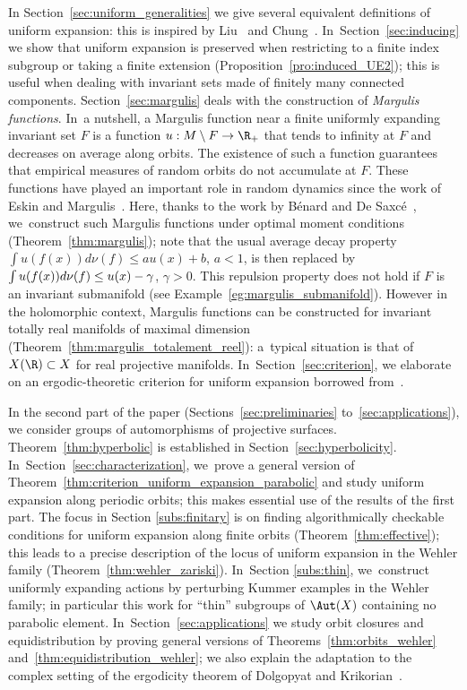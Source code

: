 In Section~\ref{sec:uniform_generalities} we give several equivalent definitions of uniform expansion:
this is inspired by Liu~\cite{liu_thesis} and Chung~\cite{chung}. In~Section~\ref{sec:inducing} we show that uniform expansion is preserved
when restricting to a finite index
subgroup or taking a finite extension (Proposition~\ref{pro:induced_UE2}); this
is useful when dealing with invariant sets made of finitely many connected components. Section~\ref{sec:margulis} deals with the construction of
\emph{Margulis functions}. In~a nutshell, a Margulis function
near a finite uniformly expanding invariant set $F$ is a function
$u:M\setminus F\to \R_+$ that tends to infinity at $F$ and decreases on average along orbits.
The existence of such a function
guarantees that empirical measures of random orbits do not accumulate at $F$. These functions have played an
important role in random dynamics since the work of Eskin and Margulis~\cite{eskin-margulis}.
Here, thanks to the work by Bénard and De Saxcé~\cite{benard-desaxce}, we~construct such Margulis functions under optimal moment conditions (Theorem~\ref{thm:margulis});
note that the usual average
decay property $\int u (f(x)) d\nu(f) \leq a u(x)+b$, $a<1$, is then replaced by $\int u (f(x)) d\nu(f) \leq u(x) -\nobreak \gamma$, $\gamma>0$. This repulsion property does not hold if $F$ is an invariant submanifold (see Example~\ref{eg:margulis_submanifold}). However in the holomorphic context, Margulis functions
can be constructed for invariant
totally real manifolds of maximal dimension (Theorem~\ref{thm:margulis_totalement_reel}): a~typical situation
is that of $X(\R)\subset X$ for real projective manifolds. In~Section~\ref{sec:criterion}, we elaborate on an ergodic-theoretic criterion for uniform expansion borrowed
from~\cite{chung}.

In the second part of the paper (Sections~\ref{sec:preliminaries} to~\ref{sec:applications}), we
consider groups of automorphisms of projective surfaces. Theorem~\ref{thm:hyperbolic}
is established in Section~\ref{sec:hyperbolicity}. In~Section~\ref{sec:characterization}, we~prove a general version of
Theorem~\ref{thm:criterion_uniform_expansion_parabolic} and
study uniform expansion along periodic orbits; this makes essential use of the results of the first part.
The focus in Section \ref{subs:finitary} is on finding
algorithmically checkable conditions for uniform expansion along finite orbits (Theorem~\ref{thm:effective});
this leads to a precise description of the locus of uniform expansion in the Wehler family (Theorem~\ref{thm:wehler_zariski}). In~Section \ref{subs:thin}, we~construct uniformly expanding actions by perturbing Kummer examples in the Wehler family;
in particular this work for ``thin'' subgroups of $\Aut(X)$ containing no parabolic element. In~Section~\ref{sec:applications} we study orbit closures and equidistribution by proving
general versions of Theorems~\ref{thm:orbits_wehler} and~\ref{thm:equidistribution_wehler};
we also explain the adaptation to the complex setting of the ergodicity
theorem of Dolgopyat and Krikorian~\cite{dolgopyat-krikorian}.

